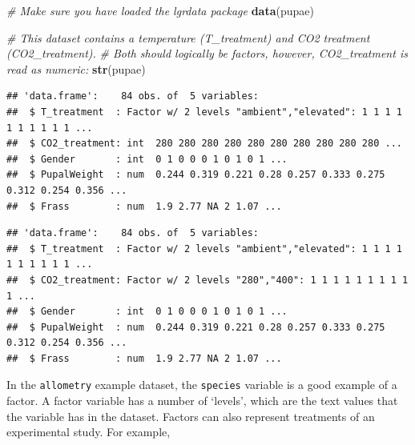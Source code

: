 \documentclass[]{book}
\newenvironment{Shaded}{\begin{snugshade}}{\end{snugshade}}
\newcommand{\CommentTok}[1]{\textcolor[rgb]{0.56,0.35,0.01}{\textit{#1}}}
\newcommand{\KeywordTok}[1]{\textcolor[rgb]{0.13,0.29,0.53}{\textbf{#1}}}
\newcommand{\NormalTok}[1]{#1}
\newcommand{\OperatorTok}[1]{\textcolor[rgb]{0.81,0.36,0.00}{\textbf{#1}}}
\newcommand{\StringTok}[1]{\textcolor[rgb]{0.31,0.60,0.02}{#1}}
\begin{document}
\begin{Shaded}
\begin{Highlighting}[]
\CommentTok{# Make sure you have loaded the lgrdata package}
\KeywordTok{data}\NormalTok{(pupae)}

\CommentTok{# This dataset contains a temperature (T_treatment) and CO2 treatment (CO2_treatment).}
\CommentTok{# Both should logically be factors, however, CO2_treatment is read as numeric:}
\KeywordTok{str}\NormalTok{(pupae)}
\end{Highlighting}
\end{Shaded}

\begin{verbatim}
## 'data.frame':    84 obs. of  5 variables:
##  $ T_treatment  : Factor w/ 2 levels "ambient","elevated": 1 1 1 1 1 1 1 1 1 1 ...
##  $ CO2_treatment: int  280 280 280 280 280 280 280 280 280 280 ...
##  $ Gender       : int  0 1 0 0 0 1 0 1 0 1 ...
##  $ PupalWeight  : num  0.244 0.319 0.221 0.28 0.257 0.333 0.275 0.312 0.254 0.356 ...
##  $ Frass        : num  1.9 2.77 NA 2 1.07 ...
\end{verbatim}

\begin{Shaded}
\end{Shaded}

\begin{verbatim}
## 'data.frame':    84 obs. of  5 variables:
##  $ T_treatment  : Factor w/ 2 levels "ambient","elevated": 1 1 1 1 1 1 1 1 1 1 ...
##  $ CO2_treatment: Factor w/ 2 levels "280","400": 1 1 1 1 1 1 1 1 1 1 ...
##  $ Gender       : int  0 1 0 0 0 1 0 1 0 1 ...
##  $ PupalWeight  : num  0.244 0.319 0.221 0.28 0.257 0.333 0.275 0.312 0.254 0.356 ...
##  $ Frass        : num  1.9 2.77 NA 2 1.07 ...
\end{verbatim}

In the \texttt{allometry} example dataset, the \texttt{species} variable is a good example of a factor. A factor variable has a number of `levels', which are the text values that the variable has in the dataset. Factors can also represent treatments of an experimental study. For example,
\end{document}
